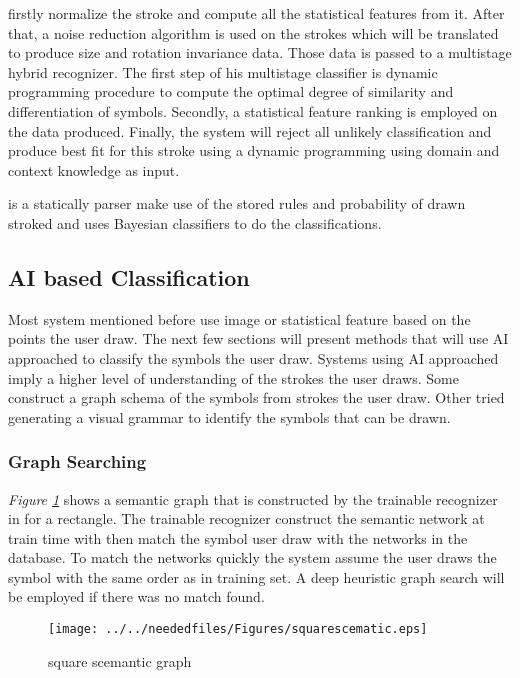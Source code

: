 \cite {HMM53}  firstly normalize the stroke and compute all the statistical features from it. After that, a noise reduction algorithm is used on the strokes which will be translated to produce size and rotation invariance data. Those data is passed to a multistage hybrid recognizer. The first step of his multistage classifier is dynamic programming procedure to compute the optimal degree of similarity and differentiation of symbols. Secondly, a statistical feature ranking is employed on the data produced. Finally, the system will reject all unlikely classification and produce best fit for this stroke using a dynamic programming using domain and context knowledge as input.

\cite{statisticalparsing26} is a statically parser make use of the stored rules and probability of drawn stroked and uses Bayesian classifiers to do the classifications.


\subsection{AI based Classification}
\label{sec:AI based Classification}

Most system mentioned before use image or statistical feature based on the points the user draw. The next few sections will present methods that will use AI approached to classify the symbols the user draw.  Systems using AI approached imply a higher level of understanding of the strokes the user draws. Some construct a graph schema of the symbols from strokes the user draw. Other tried generating a visual grammar to identify the symbols that can be drawn.


\subsubsection{Graph Searching }
\label{sec:Graph Searching }

\textit{Figure \ref{fig:squarescematic}} shows a semantic graph that is constructed by the trainable recognizer in  \cite{mulitstroke5} for a rectangle. The trainable recognizer construct the semantic network at train time with then match the symbol user draw with the networks in the database. To match the networks quickly the system assume the user draws the symbol with the same order as in training set. A deep heuristic graph search will be employed if there was no match found.

\begin{figure}
	\centering
		\texttt{[image: ../../neededfiles/Figures/squarescematic.eps]}
	\caption{square scemantic graph}
	\label{fig:squarescematic}
\end{figure}


